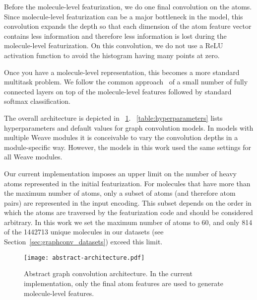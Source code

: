 Before the molecule-level featurization, we do one final convolution on the
atoms. Since molecule-level featurization can be a major bottleneck in the
model, this convolution expands the depth so that each dimension of the atom
feature vector contains less information and therefore less information is lost
during the molecule-level featurization. On this convolution, we do not use a
ReLU activation function to avoid the histogram having many points at zero.

Once you have a molecule-level representation, this becomes a more standard
multitask problem. We follow the common
approach~\citep{ramsundar2015massively, ma2015deep, mayr2015deeptox}
of a small number of fully connected layers on top of the molecule-level
features followed by standard softmax classification.

The overall architecture is depicted in
\figurename~\ref{fig:abstract_architecture}.
\tablename~\ref{table:hyperparameters} lists hyperparameters and default values
for graph convolution models.
In models with multiple Weave modules it is conceivable to vary the
convolution depths in a module-specific way. However, the models in this work
used the same settings for all Weave modules.

Our current implementation imposes an upper limit on the number of heavy atoms
represented in the initial featurization. For molecules that have more than the
maximum number of atoms, only a subset of atoms (and therefore atom pairs) are
represented in the input encoding. This subset depends on the order in which the
atoms are traversed by the featurization code and should be considered
arbitrary. In this work we set the maximum number of atoms to 60, and only
\num{814} of the \num{1442713} unique molecules in our datasets (see
Section~\ref{sec:graphconv_datasets}) exceed this limit.

\begin{figure}[tb]
\centering
  \texttt{[image: abstract-architecture.pdf]}
  \caption{Abstract graph convolution architecture. In the current
  implementation, only the final atom features are used to generate
  molecule-level features.}
  \label{fig:abstract_architecture}
\end{figure}

